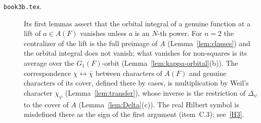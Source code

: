 \begin{description}
\item[\texttt{book3b.tex}.] Its first lemmas assert that the orbital integral of a genuine function at a lift of $a\in A(F)$ vanishes unless $a$ is an $N$-th power. For $n=2$ the centralizer of the lift is the full preimage of $A$ (Lemma~\ref{lem:classes}) and the orbital integral does not vanish; what vanishes for non-squares is its average over the $G_1(F)$-orbit (Lemma~\ref{lem:kappa-orbital}(b)). The correspondence $\chi\leftrightarrow\bar\chi$ between characters of $A(F)$ and genuine characters of its cover, defined there by cases, is multiplication by Weil's character $\chi_\psi$ (Lemma~\ref{lem:transfer}), whose inverse is the restriction of $\Delta_\psi$ to the cover of $A$ (Lemma~\ref{lem:Delta}(c)). The real Hilbert symbol is misdefined there as the sign of the first argument (item~C.3); see~\ref{H3}.

\end{description}
